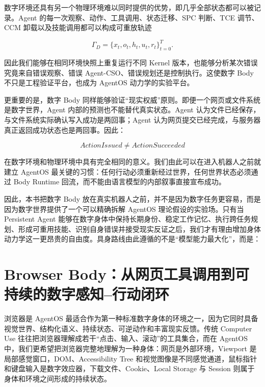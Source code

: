 数字环境还具有另一个物理环境难以同时提供的优势，即几乎全部状态都可以被记录。Agent 的每一次观察、动作、工具调用、状态迁移、SPC 判断、TCE 调节、CCM 卸载以及技能调用都可以构成可重放轨迹

$$
\Gamma_D=
\{x_t,o_t,h_t,u_t,r_t\}_{t=0}^{T}.
$$

因此我们能够在相同环境快照上重复运行不同 Kernel 版本，也能够分析某次错误究竟来自错误观察、错误 Agent-CSO、错误规划还是控制执行。这使数字 Body 不只是工程验证平台，也成为 AgentOS 动力学的实验平台。

更重要的是，数字 Body 同样能够验证“现实权威”原则。即便一个网页或文件系统是数字世界，Agent 内部的预测也不能替代真实状态。Agent 认为文件已经保存，与文件系统实际确认写入成功是两回事；Agent 认为网页提交已经完成，与服务器真正返回成功状态也是两回事。因此：

$$
\boxed{
ActionIssued\neq ActionSucceeded
}
$$

在数字环境和物理环境中具有完全相同的意义。我们由此可以在进入机器人之前就建立 AgentOS 最关键的习惯：任何行动必须重新经过世界，任何世界状态必须通过 Body Runtime 回流，而不能由语言模型的内部叙事直接宣布成功。

因此，本书把数字 Body 放在真实机器人之前，并不是因为数字任务更容易，而是因为数字世界提供了一个可以精确拆解 AgentOS 理论假设的实验场。只有当 Persistent Agent 能够在数字身体中保持长期身份、稳定工作记忆、执行跨任务规划、形成可重用技能、识别自身错误并接受现实反证之后，我们才有理由增加身体动力学这一更昂贵的自由度。具身路线由此遵循的不是“模型能力最大化”，而是：

\begin{statementbox}
\centering
{}
\end{statementbox}

\section{Browser Body：从网页工具调用到可持续的数字感知--行动闭环}

浏览器是 AgentOS 最适合作为第一种标准数字身体的环境之一，因为它同时具备视觉世界、结构化语义、持续状态、可逆动作和丰富现实反馈。传统 Computer Use 往往把浏览器理解成若干“点击、输入、滚动”的工具集合，而在 AgentOS 中，我们更希望把浏览器完整地理解为一种身体：网页是外部环境，Viewport 是局部感觉窗口，DOM、Accessibility Tree 和视觉图像是不同感觉通道，鼠标指针和键盘输入是数字效应器，下载文件、Cookie、Local Storage 与 Session 则属于身体和环境之间形成的持续状态。

